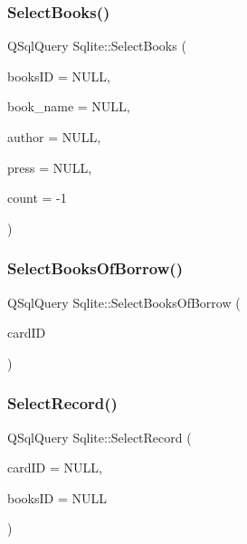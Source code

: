 \mbox{\label{class_sqlite_a045a181307b20222cd5a6c6f5f428281}} 
\subsubsection{\texorpdfstring{SelectBooks()}{SelectBooks()}}
{\footnotesize\ttfamily Q\+Sql\+Query Sqlite\+::\+Select\+Books (\begin{DoxyParamCaption}\item[{Q\+String}]{books\+ID = {\ttfamily NULL},  }\item[{Q\+String}]{book\+\_\+name = {\ttfamily NULL},  }\item[{Q\+String}]{author = {\ttfamily NULL},  }\item[{Q\+String}]{press = {\ttfamily NULL},  }\item[{int}]{count = {\ttfamily -\/1} }\end{DoxyParamCaption})}

\mbox{\label{class_sqlite_ab9e451e38960661c5a493948453b63c7}} 
\subsubsection{\texorpdfstring{SelectBooksOfBorrow()}{SelectBooksOfBorrow()}}
{\footnotesize\ttfamily Q\+Sql\+Query Sqlite\+::\+Select\+Books\+Of\+Borrow (\begin{DoxyParamCaption}\item[{Q\+String}]{card\+ID }\end{DoxyParamCaption})}

\mbox{\label{class_sqlite_a3c012aa302538385ce05d0b0371a9860}} 
\subsubsection{\texorpdfstring{SelectRecord()}{SelectRecord()}}
{\footnotesize\ttfamily Q\+Sql\+Query Sqlite\+::\+Select\+Record (\begin{DoxyParamCaption}\item[{Q\+String}]{card\+ID = {\ttfamily NULL},  }\item[{Q\+String}]{books\+ID = {\ttfamily NULL} }\end{DoxyParamCaption})}


